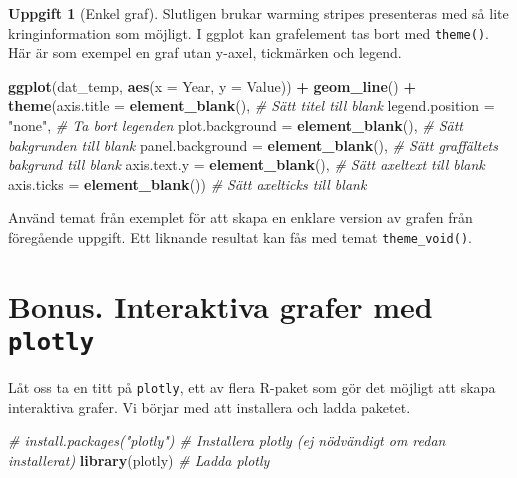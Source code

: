 \documentclass[
]{book}
\newenvironment{Shaded}{\begin{snugshade}}{\end{snugshade}}
\newcommand{\AttributeTok}[1]{\textcolor[rgb]{0.13,0.29,0.53}{#1}}
\newcommand{\CommentTok}[1]{\textcolor[rgb]{0.56,0.35,0.01}{\textit{#1}}}
\newcommand{\FunctionTok}[1]{\textcolor[rgb]{0.13,0.29,0.53}{\textbf{#1}}}
\newcommand{\NormalTok}[1]{#1}
\newcommand{\SpecialCharTok}[1]{\textcolor[rgb]{0.81,0.36,0.00}{\textbf{#1}}}
\newcommand{\StringTok}[1]{\textcolor[rgb]{0.31,0.60,0.02}{#1}}
\theoremstyle{definition}
\theoremstyle{definition}
\theoremstyle{definition}
\newtheorem{exercise}{Uppgift}[chapter]
\theoremstyle{definition}
\theoremstyle{remark}
\begin{document}
\begin{exercise}[Enkel graf]
Slutligen brukar warming stripes presenteras med så lite kringinformation som möjligt. I ggplot kan grafelement tas bort med \texttt{theme()}. Här är som exempel en graf utan y-axel, tickmärken och legend.

\begin{Shaded}
\begin{Highlighting}[]
\FunctionTok{ggplot}\NormalTok{(dat\_temp, }\FunctionTok{aes}\NormalTok{(}\AttributeTok{x =}\NormalTok{ Year, }\AttributeTok{y =}\NormalTok{ Value)) }\SpecialCharTok{+}
  \FunctionTok{geom\_line}\NormalTok{() }\SpecialCharTok{+}
  \FunctionTok{theme}\NormalTok{(}\AttributeTok{axis.title =} \FunctionTok{element\_blank}\NormalTok{(),            }\CommentTok{\# Sätt titel till blank}
        \AttributeTok{legend.position =} \StringTok{"none"}\NormalTok{,                }\CommentTok{\# Ta bort legenden}
        \AttributeTok{plot.background =} \FunctionTok{element\_blank}\NormalTok{(),       }\CommentTok{\# Sätt bakgrunden till blank}
        \AttributeTok{panel.background =} \FunctionTok{element\_blank}\NormalTok{(),      }\CommentTok{\# Sätt graffältets bakgrund till blank}
        \AttributeTok{axis.text.y =} \FunctionTok{element\_blank}\NormalTok{(),           }\CommentTok{\# Sätt axeltext till blank}
        \AttributeTok{axis.ticks =} \FunctionTok{element\_blank}\NormalTok{())            }\CommentTok{\# Sätt axelticks till blank}
\end{Highlighting}
\end{Shaded}

Använd temat från exemplet för att skapa en enklare version av grafen från föregående uppgift. Ett liknande resultat kan fås med temat \texttt{theme\_void()}.
\end{exercise}

\hypertarget{bonus.-interaktiva-grafer-med-plotly}{%
\section{\texorpdfstring{Bonus. Interaktiva grafer med \texttt{plotly}}{Bonus. Interaktiva grafer med plotly}}\label{bonus.-interaktiva-grafer-med-plotly}}

Låt oss ta en titt på \texttt{plotly}, ett av flera R-paket som gör det möjligt att skapa interaktiva grafer. Vi börjar med att installera och ladda paketet.

\begin{Shaded}
\begin{Highlighting}[]
\CommentTok{\# install.packages("plotly")                     \# Installera plotly (ej nödvändigt om redan installerat)}
\FunctionTok{library}\NormalTok{(plotly)                                  }\CommentTok{\# Ladda plotly}
\end{Highlighting}
\end{Shaded}
\end{document}
